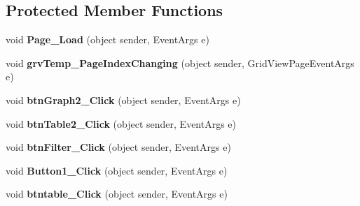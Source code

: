 \subsection*{Protected Member Functions}
\begin{DoxyCompactItemize}
\item 
\hypertarget{classusertrackmyhealth__temperature__graph_ada683ebf44d570a6f334fa3a53f9bac2}{void {\bfseries Page\-\_\-\-Load} (object sender, Event\-Args e)}\label{classusertrackmyhealth__temperature__graph_ada683ebf44d570a6f334fa3a53f9bac2}

\item 
\hypertarget{classusertrackmyhealth__temperature__graph_a57232b58e6d4f41390a6e908351ff11f}{void {\bfseries grv\-Temp\-\_\-\-Page\-Index\-Changing} (object sender, Grid\-View\-Page\-Event\-Args e)}\label{classusertrackmyhealth__temperature__graph_a57232b58e6d4f41390a6e908351ff11f}

\item 
\hypertarget{classusertrackmyhealth__temperature__graph_a071df79be863999cec585f5bcfd20f02}{void {\bfseries btn\-Graph2\-\_\-\-Click} (object sender, Event\-Args e)}\label{classusertrackmyhealth__temperature__graph_a071df79be863999cec585f5bcfd20f02}

\item 
\hypertarget{classusertrackmyhealth__temperature__graph_ac92792c6d84f30e6db5dbb113ab0c3f2}{void {\bfseries btn\-Table2\-\_\-\-Click} (object sender, Event\-Args e)}\label{classusertrackmyhealth__temperature__graph_ac92792c6d84f30e6db5dbb113ab0c3f2}

\item 
\hypertarget{classusertrackmyhealth__temperature__graph_a69cd725e651bfa000e5fd9430121e8b4}{void {\bfseries btn\-Filter\-\_\-\-Click} (object sender, Event\-Args e)}\label{classusertrackmyhealth__temperature__graph_a69cd725e651bfa000e5fd9430121e8b4}

\item 
\hypertarget{classusertrackmyhealth__temperature__graph_a507e535b44bfff55097286b6a20c2a84}{void {\bfseries Button1\-\_\-\-Click} (object sender, Event\-Args e)}\label{classusertrackmyhealth__temperature__graph_a507e535b44bfff55097286b6a20c2a84}

\item 
\hypertarget{classusertrackmyhealth__temperature__graph_a74015065bba07e0ba783042b39aed72b}{void {\bfseries btntable\-\_\-\-Click} (object sender, Event\-Args e)}\label{classusertrackmyhealth__temperature__graph_a74015065bba07e0ba783042b39aed72b}


\end{DoxyCompactItemize}
